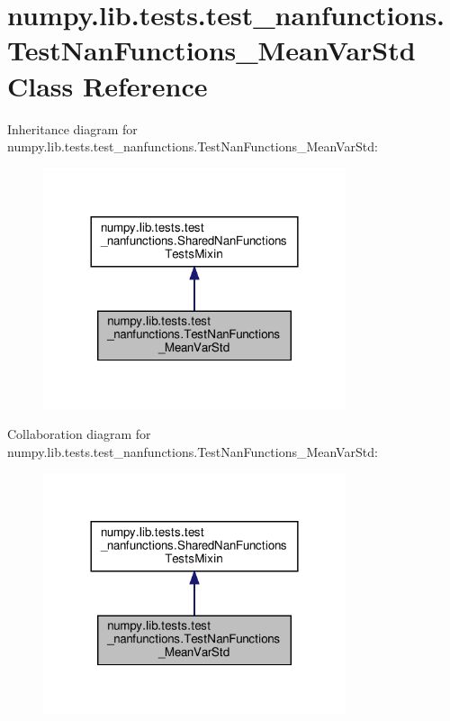 \hypertarget{classnumpy_1_1lib_1_1tests_1_1test__nanfunctions_1_1TestNanFunctions__MeanVarStd}{}\section{numpy.\+lib.\+tests.\+test\+\_\+nanfunctions.\+Test\+Nan\+Functions\+\_\+\+Mean\+Var\+Std Class Reference}
\label{classnumpy_1_1lib_1_1tests_1_1test__nanfunctions_1_1TestNanFunctions__MeanVarStd}


Inheritance diagram for numpy.\+lib.\+tests.\+test\+\_\+nanfunctions.\+Test\+Nan\+Functions\+\_\+\+Mean\+Var\+Std\+:
\nopagebreak
\begin{figure}[H]
\begin{center}
\leavevmode
\includegraphics[width=252pt]{classnumpy_1_1lib_1_1tests_1_1test__nanfunctions_1_1TestNanFunctions__MeanVarStd__inherit__graph}
\end{center}
\end{figure}


Collaboration diagram for numpy.\+lib.\+tests.\+test\+\_\+nanfunctions.\+Test\+Nan\+Functions\+\_\+\+Mean\+Var\+Std\+:
\nopagebreak
\begin{figure}[H]
\begin{center}
\leavevmode
\includegraphics[width=252pt]{classnumpy_1_1lib_1_1tests_1_1test__nanfunctions_1_1TestNanFunctions__MeanVarStd__coll__graph}
\end{center}
\end{figure}
